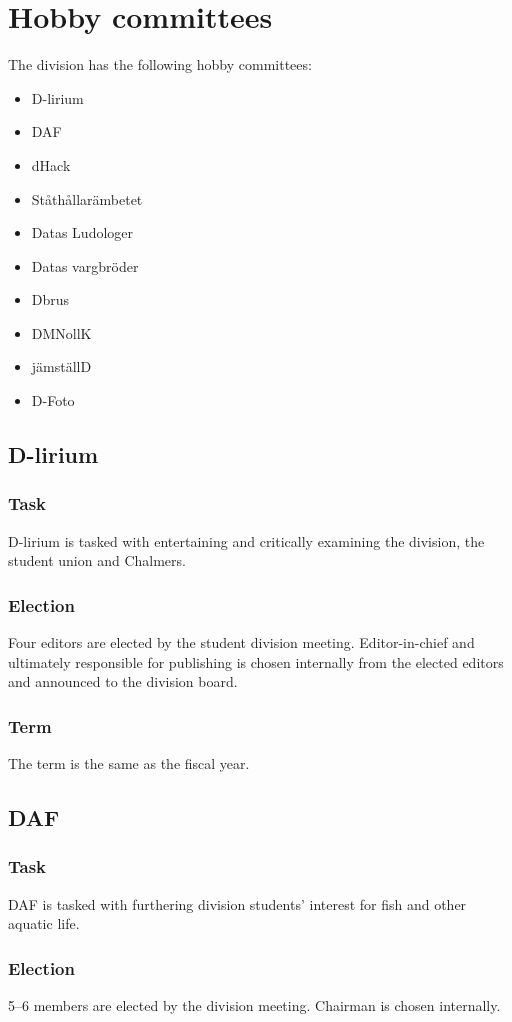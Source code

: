 \section{Hobby committees}
The division has the following hobby committees:
\begin{itemize}
  \item D-lirium 
  \item DAF
  \item dHack
  \item Ståthållarämbetet
  \item Datas Ludologer 
  \item Datas vargbröder
  \item Dbrus
  \item DMNollK
  \item jämställD
  \item D-Foto
\end{itemize}

\subsection{D-lirium}
\subsubsection{Task}
D-lirium is tasked with entertaining and critically examining the division, the student union and Chalmers. 
\subsubsection{Election}
Four editors are elected by the student division meeting. Editor-in-chief and ultimately responsible for publishing is chosen internally from the elected editors and announced to the division board.
\subsubsection{Term}
The term is the same as the fiscal year. 

\subsection{DAF}
\subsubsection{Task}
DAF is tasked with furthering division students' interest for fish and other aquatic life. 
\subsubsection{Election}
5--6 members are elected by the division meeting. Chairman is chosen internally. 
